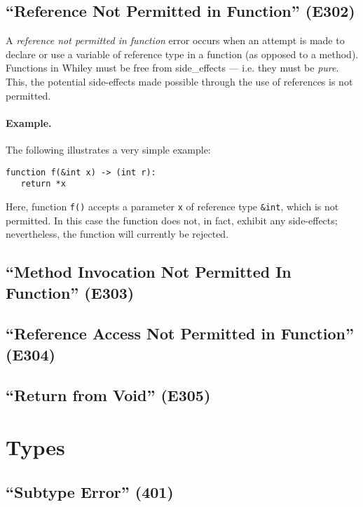 \subsection{``Reference Not Permitted in Function'' (E302)}

A {\em reference not permitted in function} error occurs when an attempt is made to declare or use a variable of reference type in a function (as opposed to a method).  Functions in Whiley must be free from \glspl{side_effect} --- i.e. they must be {\em pure}.  This, the potential side-effects made possible through the use of references is not permitted.

\paragraph{Example.}  The following illustrates a very simple example:

\begin{lstlisting}
function f(&int x) -> (int r):
   return *x
\end{lstlisting}

Here, function \lstinline{f()} accepts a parameter \lstinline{x} of reference type \lstinline{&int}, which is not permitted.  In this case the function does not, in fact, exhibit any side-effects; nevertheless, the function will currently be rejected.

\subsection{``Method Invocation Not Permitted In Function'' (E303)}

\subsection{``Reference Access Not Permitted in Function'' (E304)}

\subsection{``Return from Void'' (E305)}
	
\section{Types}
\label{c_err_types}

\subsection{``Subtype Error'' (401)}

